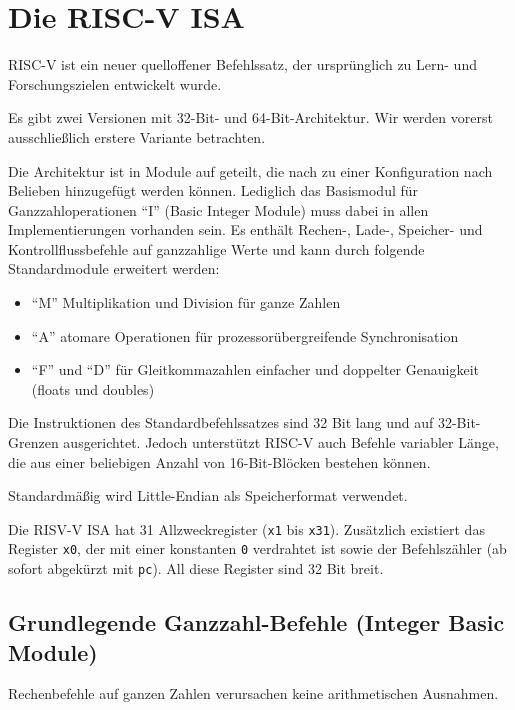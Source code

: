 \section{Die RISC-V ISA}

RISC-V ist ein neuer quelloffener Befehlssatz, der
ursprünglich zu Lern- und Forschungszielen entwickelt wurde.

Es gibt zwei Versionen mit 32-Bit- und 64-Bit-Architektur. Wir werden
vorerst ausschließlich erstere Variante betrachten.

Die Architektur ist in Module auf geteilt, die nach zu einer Konfiguration nach Belieben hinzugefügt werden können.
Lediglich das Basismodul für Ganzzahloperationen ``I'' (Basic Integer Module) muss dabei in allen Implementierungen vorhanden sein.
Es enthält Rechen-, Lade-, Speicher- und Kontrollflussbefehle auf ganzzahlige Werte und kann durch folgende
Standardmodule erweitert werden:

\begin{itemize}
\item ``M'' Multiplikation und Division für ganze Zahlen
\item ``A'' atomare Operationen für prozessorübergreifende Synchronisation
\item ``F'' und ``D'' für Gleitkommazahlen einfacher und doppelter Genauigkeit (floats und doubles)
\end{itemize}

Die Instruktionen des Standardbefehlssatzes sind 32 Bit lang und auf
32-Bit-Grenzen ausgerichtet. Jedoch unterstützt RISC-V auch Befehle variabler Länge, die
aus einer beliebigen Anzahl von 16-Bit-Blöcken bestehen können.

Standardmäßig wird Little-Endian als Speicherformat verwendet.

Die RISV-V ISA hat 31 Allzweckregister (\lstinline[style=risc-v_Assembler]!x1! bis \lstinline[style=risc-v_Assembler]!x31!). Zusätzlich existiert das Register \lstinline[style=risc-v_Assembler]!x0!, der mit einer konstanten \lstinline[style=risc-v_Assembler]!0! verdrahtet ist sowie der Befehlszähler (ab sofort abgekürzt mit \lstinline[style=risc-v_Assembler]!pc!). All diese Register sind 32 Bit breit.

\subsection{Grundlegende Ganzzahl-Befehle (Integer Basic Module)}

Rechenbefehle auf ganzen Zahlen verursachen keine arithmetischen Ausnahmen.

